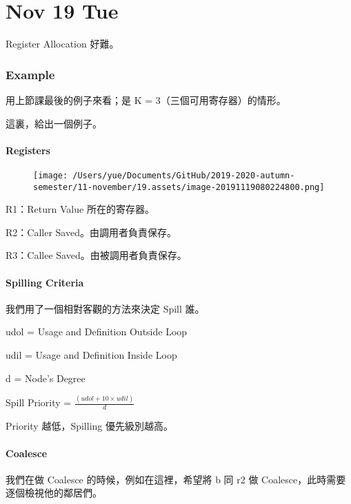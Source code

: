 \documentclass[
]{article}
\date{}
\begin{document}
\hypertarget{header-n0}{%
\section{Nov 19 Tue}\label{header-n0}}

Register Allocation 好難。

\hypertarget{header-n3}{%
\subsubsection{Example}\label{header-n3}}

用上節課最後的例子來看；是 K = 3（三個可用寄存器）的情形。

這裏，給出一個例子。

\hypertarget{header-n6}{%
\paragraph{Registers}\label{header-n6}}

\begin{figure}
\centering
\texttt{[image: /Users/yue/Documents/GitHub/2019-2020-autumn-semester/11-november/19.assets/image-20191119080224800.png]}
\caption{}
\end{figure}

R1：Return Value 所在的寄存器。

R2：Caller Saved。由調用者負責保存。

R3：Callee Saved。由被調用者負責保存。

\hypertarget{header-n11}{%
\paragraph{Spilling Criteria}\label{header-n11}}

我們用了一個相對客觀的方法來決定 Spill 誰。

udol = Usage and Definition Outside Loop

udil = Usage and Definition Inside Loop

d = Node's Degree

Spill Priority = \(\frac {(udol + 10\times udil)} d\)

Priority 越低，Spilling 優先級別越高。

\hypertarget{header-n18}{%
\paragraph{Coalesce}\label{header-n18}}

我們在做 Coalesce 的時候，例如在這裡，希望將 b 同 r2 做
Coalesce，此時需要逐個檢視他的鄰居們。
\end{document}
